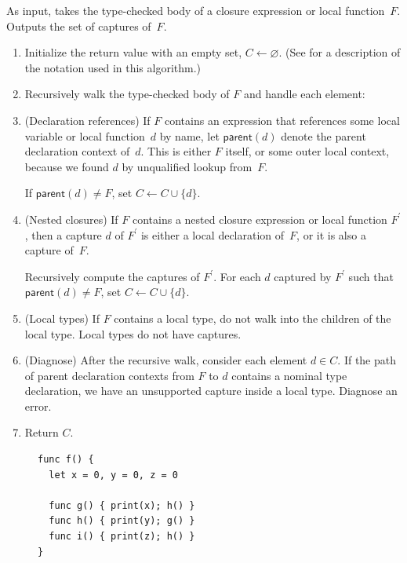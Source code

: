 \documentclass[../generics]{subfiles}
\begin{document}
\begin{algorithm}\label{closure captures algorithm}
As input, takes the type-checked body of a closure expression or local function~$F$. Outputs the set of captures of~$F$.
\begin{enumerate}
\item Initialize the return value with an empty set, $C\leftarrow\varnothing$. (See  for a description of the notation used in this algorithm.)
\item Recursively walk the type-checked body of $F$ and handle each element:
\item (Declaration references) If $F$ contains an expression that references some local variable or local function~$d$ by name, let $\mathsf{parent}(d)$ denote the parent declaration context of~$d$. This is either $F$ itself, or some outer local context, because we found $d$ by unqualified lookup from~$F$.

If $\mathsf{parent}(d)\neq F$, set $C\leftarrow C\cup\{d\}$.
\item (Nested closures) If $F$ contains a nested closure expression or local function $F^\prime$, then a capture $d$ of $F^\prime$ is either a local declaration of~$F$, or it is also a capture of~$F$.

Recursively compute the captures of $F^\prime$. For each $d$ captured by $F^\prime$ such that $\mathsf{parent}(d)\neq F$, set $C\leftarrow C\cup\{d\}$.

\item (Local types) If $F$ contains a local type, do not walk into the children of the local type. Local types do not have captures.

\item (Diagnose) After the recursive walk, consider each element $d\in C$. If the path of parent declaration contexts from $F$ to $d$ contains a nominal type declaration, we have an unsupported capture inside a local type. Diagnose an error.

\item Return $C$.
\end{enumerate}
\end{algorithm}

\begin{figure}
\begin{minipage}{16.5em}
\begin{Verbatim}
func f() {
  let x = 0, y = 0, z = 0

  func g() { print(x); h() }
  func h() { print(y); g() }
  func i() { print(z); h() }
}
\end{Verbatim}
\end{minipage}
\end{figure}
\end{document}
